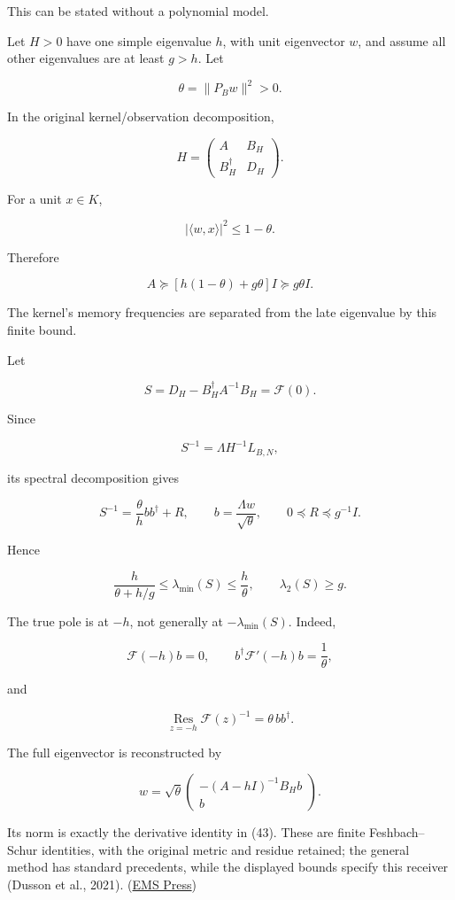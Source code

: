 \documentclass[11pt]{article}
\begin{document}
This can be stated without a polynomial model.

Let \(H>0\) have one simple eigenvalue \(h\), with unit eigenvector \(w\), and assume all other eigenvalues are at least \(g>h\). Let

\[
\theta=\|P_Bw\|^2>0.
\]

In the original kernel/observation decomposition,

\[
H=\begin{pmatrix}A&B_H\\B_H^\dagger&D_H\end{pmatrix}.
\]

For a unit \(x\in K\),

\[
|\langle w,x\rangle|^2\le1-\theta.
\]

Therefore

\[
\boxed{
A\succeq[h(1-\theta)+g\theta]I\succeq g\theta I.
}
\tag{41}
\]

The kernel's memory frequencies are separated from the late eigenvalue by this finite bound.

Let

\[
S=D_H-B_H^\dagger A^{-1}B_H=\mathcal F(0).
\]

Since

\[
S^{-1}=\Lambda H^{-1}L_{B,N},
\]

its spectral decomposition gives

\[
S^{-1}
=
\frac{\theta}{h}bb^\dagger+R,
\qquad
b=\frac{\Lambda w}{\sqrt\theta},
\qquad
0\preceq R\preceq g^{-1}I.
\]

Hence

\[
\boxed{
\frac{h}{\theta+h/g}
\le\lambda_{\min}(S)
\le\frac h\theta,
\qquad
\lambda_2(S)\ge g.
}
\tag{42}
\]

The true pole is at \(-h\), not generally at \(-\lambda_{\min}(S)\). Indeed,

\[
\boxed{
\mathcal F(-h)b=0,\qquad
b^\dagger\mathcal F'(-h)b=\frac1\theta,
}
\tag{43}
\]

and

\[
\boxed{
\operatorname*{Res}_{z=-h}\mathcal F(z)^{-1}
=\theta\,bb^\dagger.
}
\tag{44}
\]

The full eigenvector is reconstructed by

\[
w=\sqrt\theta
\begin{pmatrix}
-(A-hI)^{-1}B_Hb\\ b
\end{pmatrix}.
\]

Its norm is exactly the derivative identity in (43). These are finite Feshbach--Schur identities, with the original metric and residue retained; the general method has standard precedents, while the displayed bounds specify this receiver (Dusson et al., 2021). (\href{https://ems.press/books/ecr/187/3518}{EMS Press})
\end{document}
